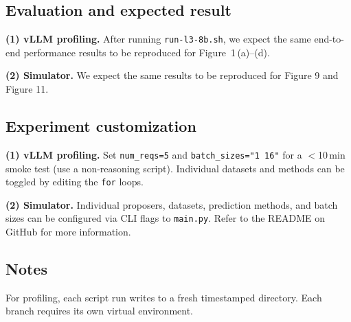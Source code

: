 \subsection{Evaluation and expected result}

\textbf{(1) vLLM profiling.}
After running \texttt{run-l3-8b.sh}, we expect the same end-to-end performance results to be reproduced for Figure~1\,(a)--(d).

\textbf{(2) Simulator.} We expect the same results to be reproduced for Figure 9 and Figure 11.

\subsection{Experiment customization}

\textbf{(1) vLLM profiling.}
Set \texttt{num\_reqs=5} and \texttt{batch\_sizes="1 16"} for a
$<$10\,min smoke test (use a non-reasoning script).
Individual datasets and methods can be toggled by editing the
\texttt{for} loops.

\textbf{(2) Simulator.}
Individual proposers, datasets, prediction methods, and batch sizes
can be configured via CLI flags to \texttt{main.py}. Refer to the README on GitHub for more information.

\subsection{Notes}

For profiling, each script run writes to a fresh timestamped directory. Each branch requires its own virtual environment.
